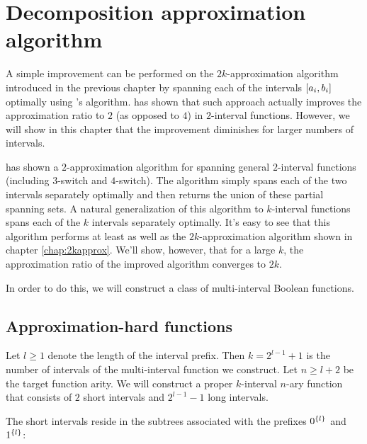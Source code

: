 \chapter{Decomposition approximation algorithm}

A simple improvement can be performed
on the $2k$-approximation algorithm introduced
in the previous chapter
by spanning each of the intervals
$[a_i, b_i]$ optimally
using \citeauthor{Schieber2005154}'s algorithm.
\citeauthor{Dubovsky2012} has shown that such approach
actually improves the approximation ratio to $2$
(as opposed to $4$)
in $2$-interval functions.
However,
we will show in this chapter that
the improvement diminishes for larger numbers of intervals.

\citeauthor{Dubovsky2012} has shown a $2$-approximation algorithm
for spanning general $2$-interval functions
(including $3$-switch and $4$-switch).\citep[p.~33]{Dubovsky2012}
The algorithm simply spans each of the two intervals
separately optimally and then returns the union
of these partial spanning sets.
A natural generalization of this algorithm to $k$-interval
functions spans each of the $k$ intervals separately
optimally.
It's easy to see that this algorithm performs
at least as well as the $2k$-approximation algorithm
shown in chapter \ref{chap:2kapprox}.
We'll show, however,
that for a large $k$,
the approximation ratio of the improved algorithm
converges to $2k$.

In order to do this,
we will construct a class of  multi-interval
Boolean functions.

\section{Approximation-hard functions}

Let $l \geq 1$
denote the length of the interval prefix.
Then $k = 2^{l-1} + 1$
is the number of intervals
of the multi-interval function we construct.
Let $n \geq l+2$ be the target function arity.
We will construct
a proper $k$-interval $n$-ary function
that consists of $2$ short intervals and $2^{l-1} - 1$
long intervals.

The short intervals reside in the subtrees associated
with the prefixes $0^{\{l\}}$ and $1^{\{l\}}$:


